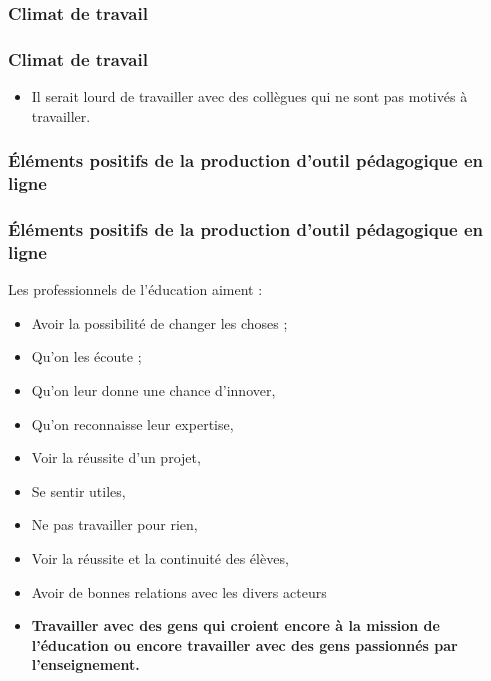 					\subsubsection{Climat de travail} 
						\begin{frame}[allowframebreaks]
						\frametitle{Climat de travail}
                        			
                        			\begin{itemize}
                        			\item Il serait lourd de travailler avec des collègues qui ne sont pas motivés à travailler.
                        				
						\end{itemize}
						\end{frame}		
						
					\subsubsection{Éléments positifs de la production d’outil pédagogique en ligne} 
						\begin{frame}[allowframebreaks]
						\frametitle{Éléments positifs de la production d’outil pédagogique en ligne}
                        			Les professionnels de l'éducation aiment : 
                        			\begin{itemize}
                        			\item Avoir la possibilité de changer les choses ;
                        			\item Qu’on les écoute ;
                        			\item Qu’on leur donne une chance d’innover, 
                        			\item Qu’on reconnaisse leur expertise, 
                        			\item Voir la réussite d’un projet, 
                        			\item Se sentir utiles, 
                        			\item Ne pas travailler pour rien, 
                        			\item Voir la réussite et la continuité des élèves,
                        			\item Avoir de bonnes relations avec les divers acteurs
                        			\item \textbf{Travailler avec des gens qui croient encore à la mission de l’éducation ou encore travailler avec des gens passionnés par l’enseignement.}
                        				
						\end{itemize}
						\end{frame}		
						
